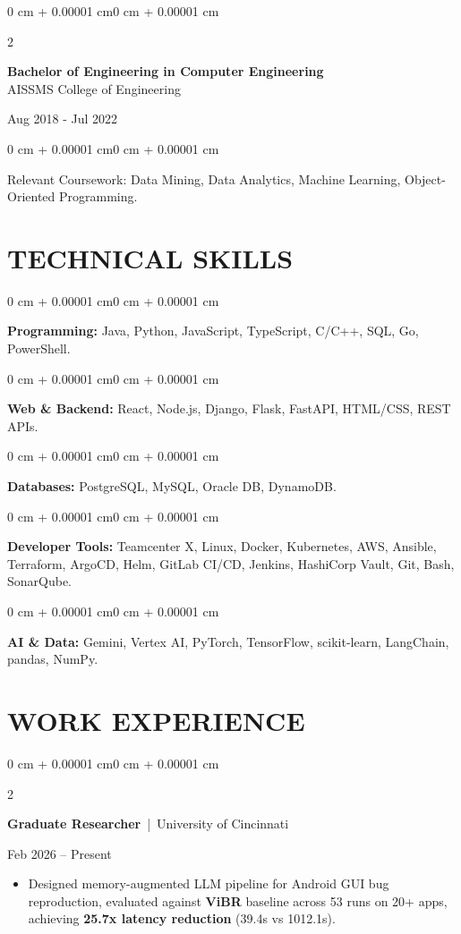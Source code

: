 \documentclass[10pt, letterpaper]{article}
\newenvironment{highlights}{
    \begin{itemize}[
        topsep=0.10 cm,
        parsep=0.06 cm,
        partopsep=0pt,
        itemsep=0.06 cm,
        leftmargin=12pt
    ]
}{
    \end{itemize}
}
\newenvironment{onecolentry}{
    \begin{adjustwidth}{0 cm + 0.00001 cm}{0 cm + 0.00001 cm}
}{
    \end{adjustwidth}
}
\newenvironment{twocolentry}[2][]{
    \onecolentry
    \def\secondColumn{#2}
    \setcolumnwidth{\fill, 4.5 cm}
    \begin{paracol}{2}
}{
    \switchcolumn \raggedleft \secondColumn
    \end{paracol}
    \endonecolentry
}
\begin{document}
\begin{twocolentry}{
    Aug 2018 - Jul 2022
}
    \textbf{Bachelor of Engineering in Computer Engineering} \\
    AISSMS College of Engineering
\end{twocolentry}
\begin{onecolentry}
Relevant Coursework: Data Mining, Data Analytics, Machine Learning, Object-Oriented Programming.
\end{onecolentry}
\section{TECHNICAL SKILLS}
\begin{onecolentry}
\textbf{Programming:} Java, Python, JavaScript, TypeScript, C/C++, SQL, Go, PowerShell.
\end{onecolentry}
\vspace{0.06 cm}
\begin{onecolentry}
\textbf{Web \& Backend:} React, Node.js, Django, Flask, FastAPI, HTML/CSS, REST APIs.
\end{onecolentry}
\vspace{0.06 cm}
\begin{onecolentry}
\textbf{Databases:} PostgreSQL, MySQL, Oracle DB, DynamoDB.
\end{onecolentry}
\vspace{0.06 cm}
\begin{onecolentry}
\textbf{Developer Tools:} Teamcenter X, Linux, Docker, Kubernetes, AWS, Ansible, Terraform, ArgoCD, Helm, GitLab CI/CD, Jenkins, HashiCorp Vault, Git, Bash, SonarQube.
\end{onecolentry}
\vspace{0.06 cm}
\begin{onecolentry}
\textbf{AI \& Data:} Gemini, Vertex AI, PyTorch, TensorFlow, scikit-learn, LangChain, pandas, NumPy.
\end{onecolentry}

\section{WORK EXPERIENCE}
\begin{twocolentry}{Feb 2026 -- Present}
\textbf{Graduate Researcher} \,|\, University of Cincinnati
\end{twocolentry}
\begin{highlights}
  \item Designed memory-augmented LLM pipeline for Android GUI bug reproduction, evaluated against \textbf{ViBR} baseline across 53 runs on 20+ apps, achieving \textbf{25.7x latency reduction} (39.4s vs 1012.1s).
\end{highlights}
\end{document}
